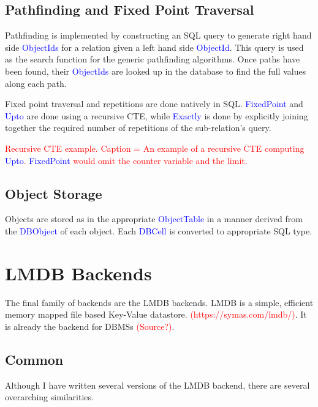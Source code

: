 \documentclass[12pt,a4paper,twoside,openright]{report}
\newcommand\todo[1]{\textcolor{red}{#1}}
\newcommand\codeName[1]{\textcolor{blue}{#1}}
\begin{document}
	\subsection{Pathfinding and Fixed Point Traversal}
Pathfinding is implemented by constructing an SQL query to generate right hand side \codeName{ObjectIds} for a relation given a left hand side \codeName{ObjectId}. This query is used as the search function for the generic pathfinding algorithms. Once paths have been found, their \codeName{ObjectIds} are looked up in the database to find the full values along each path.

Fixed point traversal and repetitions are done natively in SQL. \codeName{FixedPoint} and \codeName{Upto} are done using a recursive CTE, while \codeName{Exactly} is done by explicitly joining together the required number of repetitions of the sub-relation’s query.	
	
	\todo{Recursive CTE example. Caption = An example of a recursive CTE computing \codeName{Upto}. \codeName{FixedPoint} would omit the counter variable and the limit.}
	
	\subsection{Object Storage}
	Objects are stored as in the appropriate \codeName{ObjectTable} in a manner derived from the \codeName{DBObject} of each object. Each \codeName{DBCell} is converted to appropriate SQL type.

\section{LMDB Backends}
The final family of backends are the LMDB backends. LMDB is a simple, efficient memory mapped file based Key-Value datastore. \todo{(https://symas.com/lmdb/)}. It is already the backend for DBMSs \todo{(Source?)}.

	\subsection{Common}
	Although I have written several versions of the LMDB backend, there are several overarching similarities.
\end{document}
